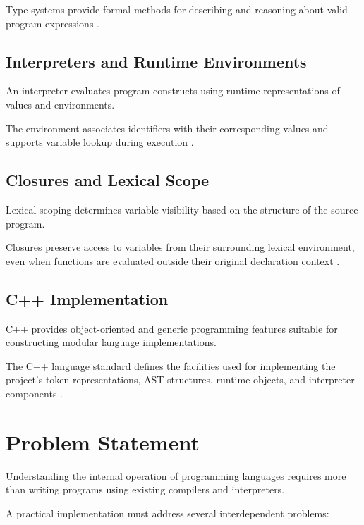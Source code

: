 \documentclass[conference]{IEEEtran}
\begin{document}
Type systems provide formal methods for describing
and reasoning about valid program expressions
\cite{pierce,types}.

\subsection{Interpreters and Runtime Environments}

An interpreter evaluates program constructs using
runtime representations of values and environments.

The environment associates identifiers with their
corresponding values and supports variable lookup
during execution \cite{sicp,crafting}.

\subsection{Closures and Lexical Scope}

Lexical scoping determines variable visibility based
on the structure of the source program.

Closures preserve access to variables from their
surrounding lexical environment, even when functions
are evaluated outside their original declaration
context \cite{sicp,appel,crafting}.

\subsection{C++ Implementation}

C++ provides object-oriented and generic programming
features suitable for constructing modular language
implementations.

The C++ language standard defines the facilities used
for implementing the project's token representations,
AST structures, runtime objects, and interpreter
components \cite{cppstandard,stroustrup}.

\section{Problem Statement}

Understanding the internal operation of programming
languages requires more than writing programs using
existing compilers and interpreters.

A practical implementation must address several
interdependent problems:
\end{document}
